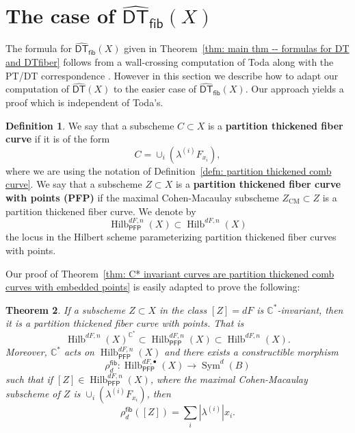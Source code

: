\documentclass[12pt]{amsart}
\newtheorem{theorem}{Theorem}%
\theoremstyle{definition}
\newtheorem{definition}[theorem]{Definition}
\newcommand{\CC} {\mathbb{C}}          %
\newcommand{\Sym}{\operatorname{Sym}}
\newcommand{\Hilb}{\operatorname{Hilb}}
\newcommand{\DT}{\mathsf{DT}}
\newcommand{\CM}{\operatorname{CM}}
\newcommand{\DThat}{\widehat{\DT}}
\newcommand{\fiber}{\mathsf{fib}}
\newcommand{\PFP}{\mathsf{PFP}}
\newcommand{\presectionspace}{\vspace{0.2cm}} %
\begin{document}
\presectionspace
\section{The case of $\DThat_{\fiber}(X)$}\label{sec: DThatfiber computation}

The formula for $\DThat_{\fiber}(X)$ given in Theorem~\ref{thm: main
thm -- formulas for DT and DTfiber} follows from a wall-crossing
computation of Toda \cite[Thm~6.9]{Toda-2012-Kyoto} along with the
PT/DT correspondence \cite{Bridgeland-PTDT}. However in this section
we describe how to adapt our computation of $\DThat (X)$ to the easier
case of $\DThat_{\fiber}(X)$. Our approach yields a proof which is
independent of Toda's.


\begin{definition}\label{defn: partition thickened fiber curve}
We say that a subscheme $C\subset X$ is a \textbf{partition thickened
fiber curve} if it is of the form
\[
C= \cup_{i}\left( \lambda^{(i)}F_{x_{i}} \right),
\]
where we are using the notation of Definition~\ref{defn: partition
thickened comb curve}. We say that a subscheme $Z\subset X$ is a
\textbf{partition thickened fiber curve with points (PFP)} if the
maximal Cohen-Macaulay subscheme $Z_{\CM}\subset Z$ is a partition
thickened fiber curve. We denote by
\[
\Hilb^{dF,n}_{\PFP}(X)\subset \Hilb^{dF,n}(X)
\]
the locus in the Hilbert scheme parameterizing partition thickened
fiber curves with points. 
\end{definition}

Our proof of Theorem~\ref{thm: C* invariant curves are partition thickened
comb curves with embedded points} is easily adapted to prove the
following:
\begin{theorem}\label{thm: C* fixed fiber curves are PFP}
If a subscheme $Z\subset X$ in the class $[Z]=dF$ is
$\CC^{*}$-invariant, then it is a partition thickened fiber curve with
points. That is
\[
\Hilb^{dF,n}(X)^{\CC^{*}} \subset \Hilb^{dF,n}_{\PFP}(X) \subset \Hilb^{dF,n}(X).
\]
Moreover, $\CC^{*}$ acts on $\Hilb^{dF,n}_{\PFP}(X)$ and there exists
a constructible morphism
\[
\rho^{\fiber}_{d}:\Hilb^{dF,\bullet}_{\PFP}(X) \to \Sym^{d}(B) 
\]
such that if $[Z]\in \Hilb^{dF,n}_{\PFP}(X)$, where the maximal
Cohen-Macaulay subscheme of $Z$ is
$\cup_{i}\left(\lambda^{(i)}F_{x_{i}} \right)$, then
\[
\rho_{d}^{\fiber}([Z]) = \sum_{i} |\lambda^{(i)}|x_{i}.
\]
\end{theorem}
\end{document}
